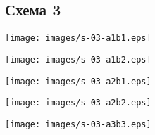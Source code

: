 \subsection{Схема 3}
\graphicspath{{\currentpath}}
\begin{comment}
scheme: s-03
view: {"a":1,"b":1}
view: {"a":1,"b":2}
view: {"a":2,"b":1}
view: {"a":2,"b":2}
view: {"a":3,"b":3}
\end{comment}

\texttt{[image: images/s-03-a1b1.eps]}

\texttt{[image: images/s-03-a1b2.eps]}

\texttt{[image: images/s-03-a2b1.eps]}

\texttt{[image: images/s-03-a2b2.eps]}

\texttt{[image: images/s-03-a3b3.eps]}